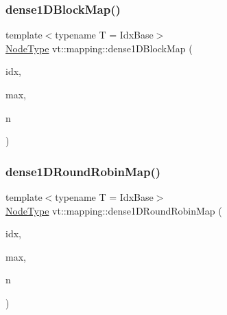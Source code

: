 \subsubsection{\texorpdfstring{dense1\+D\+Block\+Map()}{dense1DBlockMap()}}
{\footnotesize\ttfamily template$<$typename T  = Idx\+Base$>$ \\
\hyperlink{namespacevt_a866da9d0efc19c0a1ce79e9e492f47e2}{Node\+Type} vt\+::mapping\+::dense1\+D\+Block\+Map (\begin{DoxyParamCaption}\item[{\hyperlink{namespacevt_1_1mapping_a8b576cf2f31069778e4951f64bccafd8}{Idx1\+D\+Ptr}$<$ T $>$}]{idx,  }\item[{\hyperlink{namespacevt_1_1mapping_a8b576cf2f31069778e4951f64bccafd8}{Idx1\+D\+Ptr}$<$ T $>$}]{max,  }\item[{\hyperlink{namespacevt_a866da9d0efc19c0a1ce79e9e492f47e2}{Node\+Type}}]{n }\end{DoxyParamCaption})}

\mbox{\label{namespacevt_1_1mapping_a2a4e62c5dc17da0032d3953c7e3cde8b}} 
\subsubsection{\texorpdfstring{dense1\+D\+Round\+Robin\+Map()}{dense1DRoundRobinMap()}}
{\footnotesize\ttfamily template$<$typename T  = Idx\+Base$>$ \\
\hyperlink{namespacevt_a866da9d0efc19c0a1ce79e9e492f47e2}{Node\+Type} vt\+::mapping\+::dense1\+D\+Round\+Robin\+Map (\begin{DoxyParamCaption}\item[{\hyperlink{namespacevt_1_1mapping_a8b576cf2f31069778e4951f64bccafd8}{Idx1\+D\+Ptr}$<$ T $>$}]{idx,  }\item[{\hyperlink{namespacevt_1_1mapping_a8b576cf2f31069778e4951f64bccafd8}{Idx1\+D\+Ptr}$<$ T $>$}]{max,  }\item[{\hyperlink{namespacevt_a866da9d0efc19c0a1ce79e9e492f47e2}{Node\+Type}}]{n }\end{DoxyParamCaption})}

\mbox{\label{namespacevt_1_1mapping_aca20bcd20c24f4a43e217ca63bf5812c}} 
